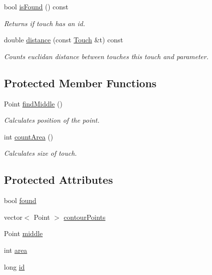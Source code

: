\begin{DoxyCompactItemize}
bool \hyperlink{class_touch_af003d36f9bcc8024c02e31d7df86a14d}{isFound} () const 
\begin{DoxyCompactList}\small\item\em Returns if touch has an id. \item\end{DoxyCompactList}\item 
double \hyperlink{class_touch_ae152f724b9e0731584b38c02f2be5593}{distance} (const \hyperlink{class_touch}{Touch} \&t) const 
\begin{DoxyCompactList}\small\item\em Counts euclidan distance between touches this touch and parameter. \item\end{DoxyCompactList}\end{DoxyCompactItemize}
\subsection*{Protected Member Functions}
\begin{DoxyCompactItemize}
\item 
Point \hyperlink{class_touch_a9a51ebdd8e213a798f8a273ca71b61df}{findMiddle} ()
\begin{DoxyCompactList}\small\item\em Calculates position of the point. \item\end{DoxyCompactList}\item 
int \hyperlink{class_touch_a70d24046564790019a8315a6a306661d}{countArea} ()
\begin{DoxyCompactList}\small\item\em Calculates size of touch. \item\end{DoxyCompactList}\end{DoxyCompactItemize}
\subsection*{Protected Attributes}
\begin{DoxyCompactItemize}
\item 
bool \hyperlink{class_touch_ad6a3432e444a0d5613605590e9869cdd}{found}
\item 
vector$<$ Point $>$ \hyperlink{class_touch_a6ebb852bd12d77132fe620eeda6ee656}{contourPoints}
\item 
Point \hyperlink{class_touch_a99a257ba0f4db4eff3be1e42577ff40f}{middle}
\item 
int \hyperlink{class_touch_a85f862123de103d39633b7908e5bf7f4}{area}
\item 
long \hyperlink{class_touch_ac21e0b89b6e9f809fde5353217519d75}{id}
\end{DoxyCompactItemize}


